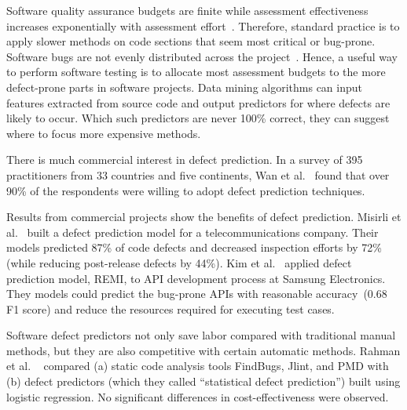 \documentclass[10pt,journal,compsoc]{IEEEtran}
\begin{document}
 Software quality assurance budgets are finite while assessment effectiveness increases exponentially with assessment effort~\cite{Fu2016TuningFS}. Therefore,  standard practice is to apply  slower  methods on code sections that seem most critical or bug-prone.
Software bugs are not evenly distributed across the project~\cite{hamill2009common,koru2009investigation, ostrand2004bugs,misirli2011ai}.  Hence, 
a useful way to perform software testing is to allocate most assessment budgets to
the more defect-prone parts in software projects.    Data mining algorithms can input
features extracted from source code and output predictors for where defects are likely to occur.
Which such  predictors are never 100\% correct,
they can  suggest where to focus more expensive methods. 



There is  much  commercial interest  in  defect prediction.  In a survey of  395 practitioners from 33 countries and five continents,
 Wan et al.~\cite{wan18} found that over 90\% of
 the respondents were willing to adopt defect prediction
 techniques. 
 
  Results from commercial projects show the benefits of defect prediction.
 Misirli et al.~\cite{misirli2011ai} built a  defect prediction model  for a telecommunications company. Their  models
  predicted 87\% of code defects and   decreased inspection efforts by 72\% (while  reducing post-release defects by 44\%).  Kim et al.~\cite{kim2015remi} applied defect prediction model, REMI, to API
development process at Samsung Electronics.
They models  could
predict the bug-prone APIs with reasonable accuracy~(0.68 F1 score) and reduce the resources required for executing test cases.



Software defect predictors not only save labor compared with traditional manual methods, but they are also competitive with certain automatic methods.  
 Rahman et al. ~\cite{rahman2014comparing} compared (a) static code analysis tools FindBugs, Jlint, and PMD with (b) defect predictors (which they called ``statistical defect prediction'') built using logistic  regression.
No significant differences in   cost-effectiveness were observed.
\end{document}
